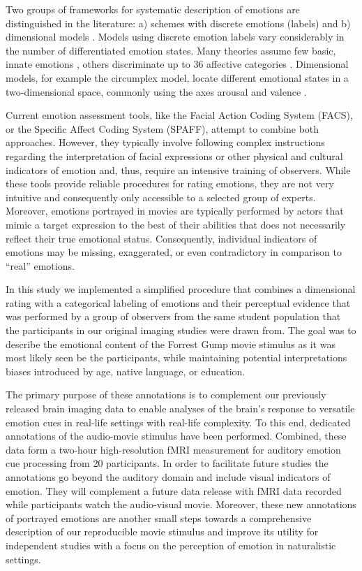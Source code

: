 Two groups of frameworks for systematic description of emotions are
distinguished in the literature: a) schemes with discrete emotions (labels) and
b) dimensional models \cite{GW2007}.  Models using discrete emotion labels vary
considerably in the number of differentiated emotion states. Many theories
assume few basic, innate emotions \cite{Ekm1992a}, others discriminate up to
36 affective categories \cite{Sch2005}.  Dimensional models, for example the
circumplex model, locate different emotional states in a two-dimensional
space, commonly using the axes arousal and valence \cite{Rus1980}.

Current emotion assessment tools, like the Facial Action Coding System (FACS),
or the Specific Affect Coding System (SPAFF)\cite{CG2007}, attempt to combine
both approaches. However, they typically involve following complex instructions
regarding the interpretation of facial expressions or other physical and
cultural indicators of emotion\cite[p. 281]{CG2007} and, thus, require an
intensive training of observers. While these tools provide reliable procedures
for rating emotions, they are not very intuitive and consequently only
accessible to a selected group of experts. Moreover, emotions portrayed in
movies are typically performed by actors that mimic a target expression to the
best of their abilities that does not necessarily reflect their true emotional
status.  Consequently, individual indicators of emotions may be missing,
exaggerated, or even contradictory in comparison to ``real'' emotions.

In this study we implemented a simplified procedure that combines a dimensional
rating with a categorical labeling of emotions and their perceptual evidence
that was performed by a group of observers from the same student population
that the participants in our original imaging studies were drawn
from\cite{HBI+14}.  The goal was to describe the emotional content of the
Forrest Gump movie stimulus as it was most likely seen be the participants,
while maintaining potential interpretations biases introduced by age, native
language, or education.

The primary purpose of these annotations is to complement our previously
released brain imaging data to enable analyses of the brain's response to
versatile emotion cues in real-life settings with real-life complexity. To this
end, dedicated annotations of the audio-movie stimulus have been performed.
Combined, these data form a two-hour high-resolution fMRI measurement for
auditory emotion cue processing from 20 participants. In order to facilitate
future studies the annotations go beyond the auditory domain and include
visual indicators of emotion. They will complement a future data release with
fMRI data recorded while participants watch the audio-visual movie.  Moreover,
these new annotations of portrayed emotions are another small steps towards a
comprehensive description of our reproducible movie stimulus\cite{HBI+14} and
improve its utility for independent studies with a focus on the perception of
emotion in naturalistic settings.


